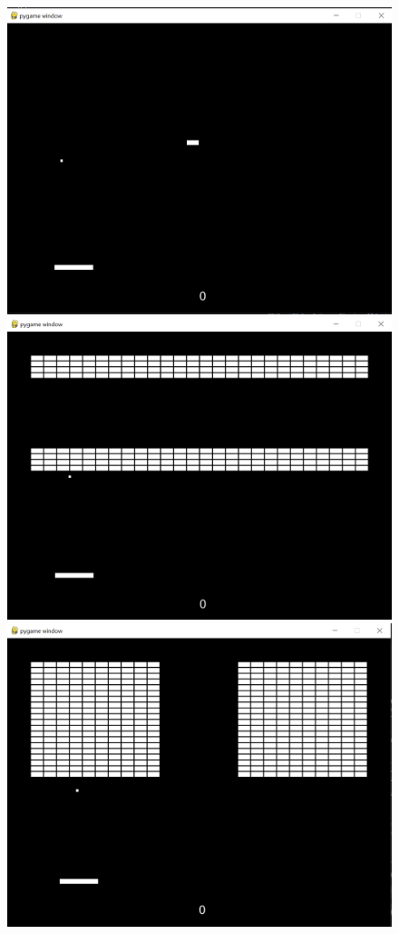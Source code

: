 \documentclass[twoside,11pt]{article}
\begin{document}
\begin{figure}[H]
\includegraphics[scale=0.2]{layout3}
\includegraphics[scale=0.2]{layout4}
\includegraphics[scale=0.2]{layout5}

\end{figure}
\end{document}
